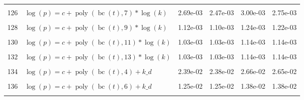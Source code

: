 \documentclass[12pt,a4paper]{article}
\DeclareMathOperator{\bc}{bc}
\DeclareMathOperator{\poly}{poly}
\begin{document}
\begin{longtable}[t]{ll>{\raggedleft\arraybackslash}p{2cm}>{\raggedleft\arraybackslash}p{2cm}>{\raggedleft\arraybackslash}p{2cm}>{\raggedleft\arraybackslash}p{2cm}}
\cellcolor{gray!6}{125} & \cellcolor{gray!6}{$\log(p) = c + \poly\left( \bc(t), 6 \right) * \log(k)$} & \cellcolor{gray!6}{1.36e-03} & \cellcolor{gray!6}{1.24e-03} & \cellcolor{gray!6}{1.51e-03} & \cellcolor{gray!6}{1.37e-03}\\
126 & $\log(p) = c + \poly\left( \bc(t), 7 \right) * \log(k)$ & 2.69e-03 & 2.47e-03 & 3.00e-03 & 2.75e-03\\
\cellcolor{gray!6}{127} & \cellcolor{gray!6}{$\log(p) = c + \poly\left( \bc(t), 8 \right) * \log(k)$} & \cellcolor{gray!6}{1.47e-03} & \cellcolor{gray!6}{1.27e-03} & \cellcolor{gray!6}{1.64e-03} & \cellcolor{gray!6}{1.41e-03}\\
128 & $\log(p) = c + \poly\left( \bc(t), 9 \right) * \log(k)$ & 1.12e-03 & 1.10e-03 & 1.24e-03 & 1.22e-03\\
\cellcolor{gray!6}{129} & \cellcolor{gray!6}{$\log(p) = c + \poly\left( \bc(t), 10 \right) * \log(k)$} & \cellcolor{gray!6}{1.06e-03} & \cellcolor{gray!6}{1.05e-03} & \cellcolor{gray!6}{1.17e-03} & \cellcolor{gray!6}{1.16e-03}\\
130 & $\log(p) = c + \poly\left( \bc(t), 11 \right) * \log(k)$ & 1.03e-03 & 1.03e-03 & 1.14e-03 & 1.14e-03\\
\cellcolor{gray!6}{131} & \cellcolor{gray!6}{$\log(p) = c + \poly\left( \bc(t), 12 \right) * \log(k)$} & \cellcolor{gray!6}{1.04e-03} & \cellcolor{gray!6}{1.03e-03} & \cellcolor{gray!6}{1.15e-03} & \cellcolor{gray!6}{1.15e-03}\\
132 & $\log(p) = c + \poly\left( \bc(t), 13 \right) * \log(k)$ & 1.03e-03 & 1.03e-03 & 1.14e-03 & 1.14e-03\\
\cellcolor{gray!6}{133} & \cellcolor{gray!6}{$\log(p) = c + \poly\left( \bc(t), 3 \right) + k\_d$} & \cellcolor{gray!6}{3.65e-02} & \cellcolor{gray!6}{2.03e-02} & \cellcolor{gray!6}{4.06e-02} & \cellcolor{gray!6}{2.24e-02}\\
134 & $\log(p) = c + \poly\left( \bc(t), 4 \right) + k\_d$ & 2.39e-02 & 2.38e-02 & 2.66e-02 & 2.65e-02\\
\cellcolor{gray!6}{135} & \cellcolor{gray!6}{$\log(p) = c + \poly\left( \bc(t), 5 \right) + k\_d$} & \cellcolor{gray!6}{1.56e-02} & \cellcolor{gray!6}{1.37e-02} & \cellcolor{gray!6}{1.73e-02} & \cellcolor{gray!6}{1.52e-02}\\
136 & $\log(p) = c + \poly\left( \bc(t), 6 \right) + k\_d$ & 1.25e-02 & 1.25e-02 & 1.38e-02 & 1.38e-02\\
\cellcolor{gray!6}{137} & \cellcolor{gray!6}{$\log(p) = c + \poly\left( \bc(t), 7 \right) + k\_d$} & \cellcolor{gray!6}{1.29e-02} & \cellcolor{gray!6}{1.28e-02} & \cellcolor{gray!6}{1.42e-02} & \cellcolor{gray!6}{1.41e-02}\\

\end{longtable}
\end{document}
